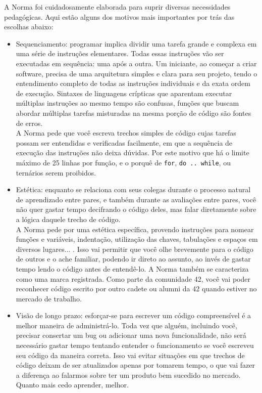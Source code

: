 \documentclass{42-pt}
\begin{document}
    A Norma foi cuidadosamente elaborada para suprir diversas necessidades
    pedagógicas. Aqui estão alguns dos motivos mais importantes por trás das
    escolhas abaixo:
    \begin{itemize}

	\item Sequenciamento: programar implica dividir uma tarefa grande e
	  complexa em uma série de instruções elementares. Todas essas instruções
	  vão ser executadas em sequência: uma após a outra. Um iniciante, ao
      começar a criar software, precisa de uma arquitetura simples e
	  clara para seu projeto, tendo o entendimento completo de todas as
      instruções individuais e da exata ordem de execução. Sintaxes de
      linguagens crípticas que aparentam executar múltiplas
	  instruções ao mesmo tempo são confusas, funções que buscam abordar
      múltiplas tarefas misturadas na mesma porção de código são fontes
      de erros. \\
	  A Norma pede que você escreva trechos simples de código cujas tarefas
	  possam ser entendidas e verificadas facilmente, em que a sequência de
      execução das instruções não deixa dúvidas. Por este motivo que há o
      limite máximo de 25 linhas por função, e o porquê de \texttt{for},
      \texttt{do .. while}, ou ternários serem proibidos.


    \item Estética: enquanto se relaciona com seus colegas durante o processo
      natural de aprendizado entre pares, e também durante as avaliações
      entre pares, você não quer gastar tempo decifrando o código deles,
      mas falar diretamente sobre a lógica daquele trecho de código.\\ A
      Norma pede por uma estética específica, provendo instruções para
      nomear funções e variáveis, indentação, utilização das chaves,
      tabulações e espaços em diversos lugares... . Isso vai permitir que
      você olhe brevemente para o código de outros e o ache familiar, podendo
      ir direto ao assunto, ao invés de gastar tempo lendo o código antes
      de entendê-lo. A Norma também se caracteriza como uma marca
      registrada. Como parte da comunidade 42, você vai poder reconhecer
      código escrito por outro cadete ou alumni da 42 quando estiver no
      mercado de trabalho.
    

    \item Visão de longo prazo: esforçar-se para escrever um código compreensível
      é a melhor maneira de administrá-lo. Toda vez que alguém, incluindo
      você, precisar consertar um bug ou adicionar uma nova
      funcionalidade, não será necessário gastar tempo tentando entender
      o funcionamento se você escreveu seu código da maneira correta. Isso
      vai evitar situações em que trechos de código deixam de ser
      atualizados apenas por tomarem tempo, o que vai fazer a diferença
      ao falarmos sobre ter um produto bem sucedido no mercado. Quanto
      mais cedo aprender, melhor.



\end{itemize}
\end{document}
